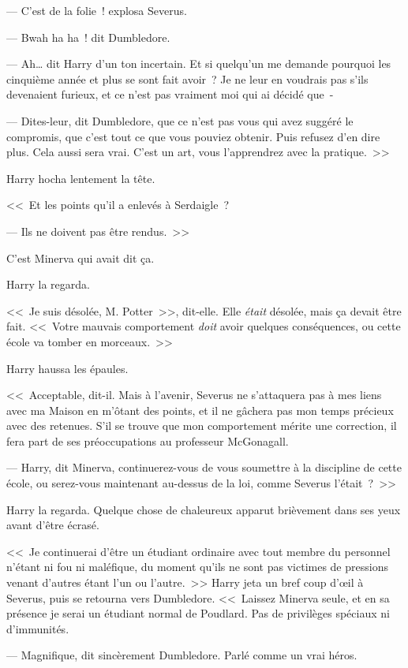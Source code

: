 --- C'est de la folie~! explosa Severus.

--- Bwah ha ha~! dit Dumbledore.

--- Ah… dit Harry d'un ton incertain. Et si quelqu'un me demande pourquoi les cinquième année et plus se sont fait avoir~? Je ne leur en voudrais pas s'ils devenaient furieux, et ce n'est pas vraiment moi qui ai décidé que~-

--- Dites-leur, dit Dumbledore, que ce n'est pas vous qui avez suggéré le compromis, que c'est tout ce que vous pouviez obtenir. Puis refusez d'en dire plus. Cela aussi sera vrai. C'est un art, vous l'apprendrez avec la pratique.~>>

Harry hocha lentement la tête.

<<~Et les points qu'il a enlevés à Serdaigle~?

--- Ils ne doivent pas être rendus.~>>

C'est Minerva qui avait dit ça.

Harry la regarda.

<<~Je suis désolée, M. Potter~>>, dit-elle. Elle \emph{était} désolée, mais ça devait être fait. <<~Votre mauvais comportement \emph{doit} avoir quelques conséquences, ou cette école va tomber en morceaux.~>>

Harry haussa les épaules.

<<~Acceptable, dit-il. Mais à l'avenir, Severus ne s'attaquera pas à mes liens avec ma Maison en m'ôtant des points, et il ne gâchera pas mon temps précieux avec des retenues. S'il se trouve que mon comportement mérite une correction, il fera part de ses préoccupations au professeur McGonagall.

--- Harry, dit Minerva, continuerez-vous de vous soumettre à la discipline de cette école, ou serez-vous maintenant au-dessus de la loi, comme Severus l'était~?~>>

Harry la regarda. Quelque chose de chaleureux apparut brièvement dans ses yeux avant d'être écrasé.

<<~Je continuerai d'être un étudiant ordinaire avec tout membre du personnel n'étant ni fou ni maléfique, du moment qu'ils ne sont pas victimes de pressions venant d'autres étant l'un ou l'autre.~>> Harry jeta un bref coup d'œil à Severus, puis se retourna vers Dumbledore. <<~Laissez Minerva seule, et en sa présence je serai un étudiant normal de Poudlard. Pas de privilèges spéciaux ni d'immunités.

--- Magnifique, dit sincèrement Dumbledore. Parlé comme un vrai héros.

